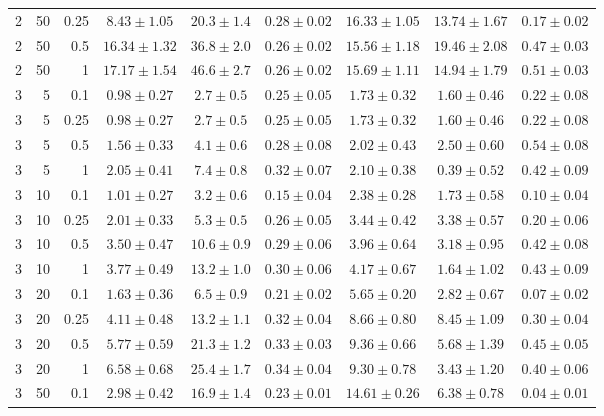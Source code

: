 \begin{table}[htbp]
\begin{tabular}{@{}rrrcccccc@{}}
2 & 50 & 0.25 & $8.43 \pm 1.05$ & $20.3 \pm 1.4$ & $0.28 \pm 0.02$ & $16.33 \pm 1.05$ & $13.74 \pm 1.67$ & $0.17 \pm 0.02$ \\
2 & 50 & 0.5 & $16.34 \pm 1.32$ & $36.8 \pm 2.0$ & $0.26 \pm 0.02$ & $15.56 \pm 1.18$ & $19.46 \pm 2.08$ & $0.47 \pm 0.03$ \\
2 & 50 & 1 & $17.17 \pm 1.54$ & $46.6 \pm 2.7$ & $0.26 \pm 0.02$ & $15.69 \pm 1.11$ & $14.94 \pm 1.79$ & $0.51 \pm 0.03$ \\
\midrule
3 & 5 & 0.1 & $0.98 \pm 0.27$ & $2.7 \pm 0.5$ & $0.25 \pm 0.05$ & $1.73 \pm 0.32$ & $1.60 \pm 0.46$ & $0.22 \pm 0.08$ \\
3 & 5 & 0.25 & $0.98 \pm 0.27$ & $2.7 \pm 0.5$ & $0.25 \pm 0.05$ & $1.73 \pm 0.32$ & $1.60 \pm 0.46$ & $0.22 \pm 0.08$ \\
3 & 5 & 0.5 & $1.56 \pm 0.33$ & $4.1 \pm 0.6$ & $0.28 \pm 0.08$ & $2.02 \pm 0.43$ & $2.50 \pm 0.60$ & $0.54 \pm 0.08$ \\
3 & 5 & 1 & $2.05 \pm 0.41$ & $7.4 \pm 0.8$ & $0.32 \pm 0.07$ & $2.10 \pm 0.38$ & $0.39 \pm 0.52$ & $0.42 \pm 0.09$ \\
3 & 10 & 0.1 & $1.01 \pm 0.27$ & $3.2 \pm 0.6$ & $0.15 \pm 0.04$ & $2.38 \pm 0.28$ & $1.73 \pm 0.58$ & $0.10 \pm 0.04$ \\
3 & 10 & 0.25 & $2.01 \pm 0.33$ & $5.3 \pm 0.5$ & $0.26 \pm 0.05$ & $3.44 \pm 0.42$ & $3.38 \pm 0.57$ & $0.20 \pm 0.06$ \\
3 & 10 & 0.5 & $3.50 \pm 0.47$ & $10.6 \pm 0.9$ & $0.29 \pm 0.06$ & $3.96 \pm 0.64$ & $3.18 \pm 0.95$ & $0.42 \pm 0.08$ \\
3 & 10 & 1 & $3.77 \pm 0.49$ & $13.2 \pm 1.0$ & $0.30 \pm 0.06$ & $4.17 \pm 0.67$ & $1.64 \pm 1.02$ & $0.43 \pm 0.09$ \\
3 & 20 & 0.1 & $1.63 \pm 0.36$ & $6.5 \pm 0.9$ & $0.21 \pm 0.02$ & $5.65 \pm 0.20$ & $2.82 \pm 0.67$ & $0.07 \pm 0.02$ \\
3 & 20 & 0.25 & $4.11 \pm 0.48$ & $13.2 \pm 1.1$ & $0.32 \pm 0.04$ & $8.66 \pm 0.80$ & $8.45 \pm 1.09$ & $0.30 \pm 0.04$ \\
3 & 20 & 0.5 & $5.77 \pm 0.59$ & $21.3 \pm 1.2$ & $0.33 \pm 0.03$ & $9.36 \pm 0.66$ & $5.68 \pm 1.39$ & $0.45 \pm 0.05$ \\
3 & 20 & 1 & $6.58 \pm 0.68$ & $25.4 \pm 1.7$ & $0.34 \pm 0.04$ & $9.30 \pm 0.78$ & $3.43 \pm 1.20$ & $0.40 \pm 0.06$ \\
3 & 50 & 0.1 & $2.98 \pm 0.42$ & $16.9 \pm 1.4$ & $0.23 \pm 0.01$ & $14.61 \pm 0.26$ & $6.38 \pm 0.78$ & $0.04 \pm 0.01$ \\

\end{tabular}
\end{table}
